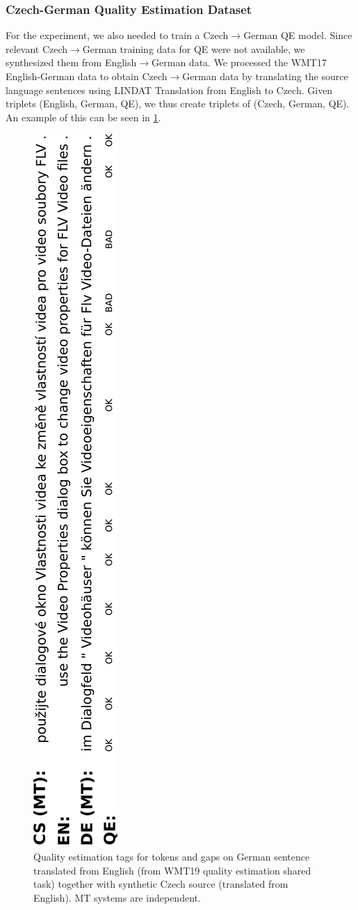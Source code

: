\subsubsection{Czech-German Quality Estimation Dataset} \label{subsec:cs_de_wmt}

For the experiment, we also needed to train a Czech$\rightarrow$German QE model. Since relevant Czech$\rightarrow$German training data for QE were not available, we synthesized them from English$\rightarrow$German data. We processed the WMT17 English-German data to obtain Czech$\rightarrow$German data by translating the source language sentences using LINDAT Translation \cite{popel-en-cs} from English to Czech. Given triplets (English, German, QE), we thus create triplets of (Czech, German, QE). An example of this can be seen in \cref{fig:tripel_qe_example}.

\begin{figure}[ht]
    \centering
    \includegraphics[height=\textwidth, angle=-90]{img/implementation/qe_example_pdfa1a.pdf}
    \caption{\label{fig:tripel_qe_example} Quality estimation tags for tokens and gaps on German sentence translated from English (from WMT19 quality estimation shared task) together with synthetic Czech source (translated from English). MT systems are independent.}
\end{figure}

